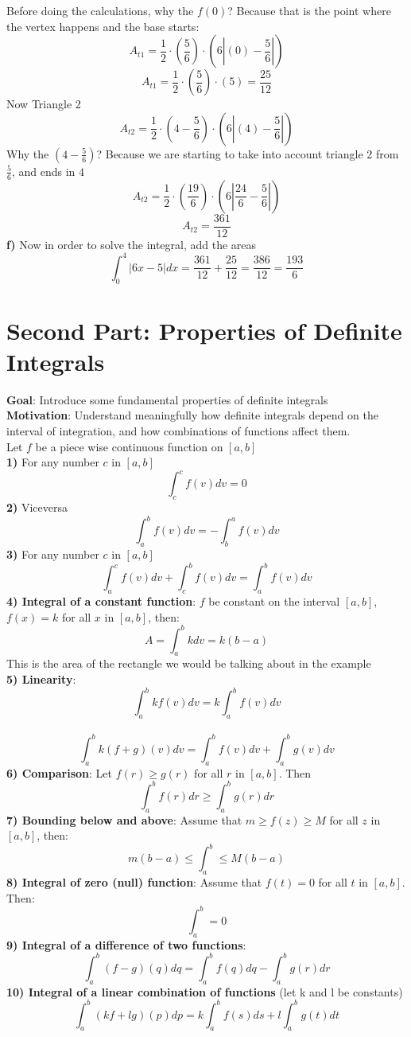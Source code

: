 \documentclass[12pt, letterpaper]{article}
\newcommand{\iii}{\ensuremath{\int_{a}^{b} f(q)dq}}
\newcommand{\ii}{\ensuremath{\int_{a}^{b}}}
\begin{document}
Before doing the calculations, why the \(f(0)\)? Because that is the point where the vertex happens and the base starts:
\[A_{t1} = \frac{1}{2}\cdot \left( \frac{5}{6} \right) \cdot \left( 6|(0)-\frac{5}{6}| \right)\]
\[A_{t1} = \frac{1}{2}\cdot \left( \frac{5}{6} \right) \cdot (5) = \frac{25}{12}\]
Now Triangle 2
\[A_{t2} = \frac{1}{2}\cdot \left( 4 - \frac{5}{6} \right) \cdot \left( 6|(4)-\frac{5}{6}| \right)\]
Why the \(\left( 4 - \frac{5}{6} \right)\)? Because we are starting to take into account triangle 2 from \(\frac{5}{6}\), and ends in \(4\)
\[A_{t2} = \frac{1}{2}\cdot \left( \frac{19}{6} \right) \cdot \left( 6|\frac{24}{6} - \frac{5}{6}| \right)\]
\[A_{t2} = \frac{361}{12}\]
\textbf{f)} Now in order to solve the integral, add the areas
\[\int_{0}^{4} |6x-5|dx = \frac{361}{12} + \frac{25}{12} = \frac{386}{12} = \frac{193}{6}\]
\section{Second Part: Properties of Definite Integrals}
\textbf{Goal}: Introduce some fundamental properties of definite integrals\\
\newline
\textbf{Motivation}: Understand meaningfully how definite integrals depend on the interval of integration, and how combinations of functions affect them.\\
\newline
Let \(f\) be a piece wise continuous function on \([a,b]\)\\
\newline
\textbf{1)} For any number \(c\) in \([a,b]\)
\[\int_{c}^{c}f(v)dv=0\]
\textbf{2)} Viceversa
\[\int_{a}^{b}f(v)dv=-\int_{b}^{a}f(v)dv\]
\textbf{3)} For any number \(c\) in \([a,b]\)
\[\int_{a}^{c}f(v)dv+\int_{c}^{b}f(v)dv = \int_{a}^{b}f(v)dv\]
\textbf{4) Integral of a constant function}: \(f\) be constant on the interval \([a,b]\), \(f(x)=k\) for all \(x\) in \([a,b]\), then:
\[A = \int_{a}^{b}kdv = k(b-a)\]
This is the area of the rectangle we would be talking about in the example\\
\newline
\textbf{5) Linearity}:
\[\int_{a}^{b}kf(v)dv= k \int_{a}^{b}f(v)dv\]\\
\[\int_{a}^{b}k(f+g)(v)dv= \int_{a}^{b}f(v)dv + \int_{a}^{b}g(v)dv\]
\textbf{6) Comparison}: Let \(f(r) \ge g(r)\) for all \(r\) in \([a,b]\). Then
\[\int_{a}^{b}f(r)dr \ge \int_{a}^{b}g(r)dr\]
\textbf{7) Bounding below and above}: Assume that \(m \ge f(z) \ge M\) for all \(z\) in \([a,b]\), then:
\[m(b-a) \le \ii \le M(b-a)\]
\textbf{8) Integral of zero (null) function}: Assume that \(f(t)=0\) for all \(t\) in \([a,b]\). Then:
\[\ii = 0\]
\textbf{9) Integral of a difference of two functions}:
\[\int_{a}^{b}(f-g)(q)dq = \iii - \int_{a}^{b}g(r)dr\]
\textbf{10) Integral of a linear combination of functions} (let k and l be constants)
\[\int_{a}^{b} (kf+lg)(p)dp = k\ii f(s)ds + l\ii g(t)dt\]
\end{document}
